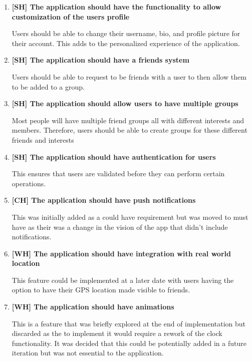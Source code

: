 \begin{enumerate}
    \item \textbf{[SH] The application should have the functionality to allow customization of the users profile } \par
    Users should be able to change their username, bio, and profile picture for their account. This adds to the personalized experience of the application.
    \item \textbf{[SH] The application should have a friends system } \par
    Users should be able to request to be friends with a user to then allow them to be added to a group.
    \item \textbf{[SH] The application should allow users to have multiple groups } \par
    Most people will have multiple friend groups all with different interests and members. Therefore, users should be able to create groups for these different friends and interests 
    \item \textbf{[SH] The application should have authentication for users } \par
    This ensures that users are validated before they can perform certain operations.
    \item \textbf{[CH] The application should have push notifications } \par
    This was initially added as a could have requirement but was moved to must have as their was a change in the vision of the app that didn't include notifications.
    \item \textbf{[WH] The application should have integration with real world location } \par
    This feature could be implemented at a later date with users having the option to have their GPS location made visible to friends.
    \item \textbf{[WH] The application should have animations } \par
    This is a feature that was briefly explored at the end of implementation but discarded as the to implement it would require a rework of the clock functionality. It was decided that this could be potentially added in a future iteration but was not essential to the application.
\end{enumerate}
